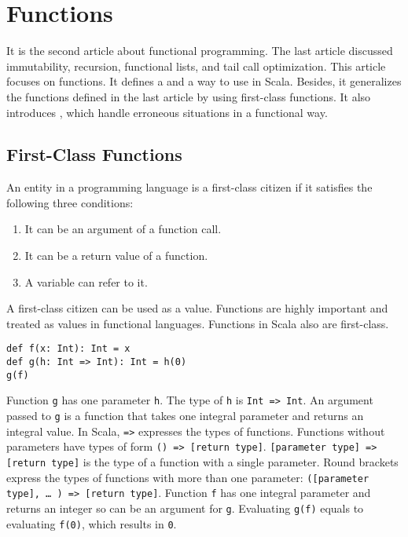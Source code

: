 \setchapterpreamble[u]{\margintoc}
\chapter{Functions}

It is the second article about functional programming. The last article discussed
immutability, recursion, functional lists, and tail call optimization. This
article focuses on functions. It defines a  and a way
to use  in Scala. Besides, it generalizes the functions
defined in the last article by using first-class functions. It also introduces
, which handle erroneous situations in a functional way.

\section{First-Class Functions}

An entity in a programming language is a first-class citizen if it satisfies the
following three conditions:

\begin{enumerate}
\item It can be an argument of a function call.
\item It can be a return value of a function.
\item A variable can refer to it.
\end{enumerate}

A first-class citizen can be used as a value. Functions are highly important and
treated as values in functional languages. Functions in Scala also are
first-class.

\begin{verbatim}
def f(x: Int): Int = x
def g(h: Int => Int): Int = h(0)
g(f)
\end{verbatim}

Function \verb!g! has one parameter \verb!h!. The type of \verb!h! is \verb!Int => Int!.
An argument passed to \verb!g! is a function that takes one integral
parameter and returns an integral value. In Scala, \verb!=>! expresses the types
of functions. Functions without parameters have types of form \verb!() => [return type]!.
\verb![parameter type] => [return type]! is the type of a function with a
single parameter. Round brackets express the types of functions with more than
one parameter: \verb!([parameter type], … ) => [return type]!. Function \verb!f!
has one integral parameter and returns an integer so can be an argument for
\verb!g!. Evaluating \verb!g(f)! equals to evaluating \verb!f(0)!, which results
in \verb!0!.

